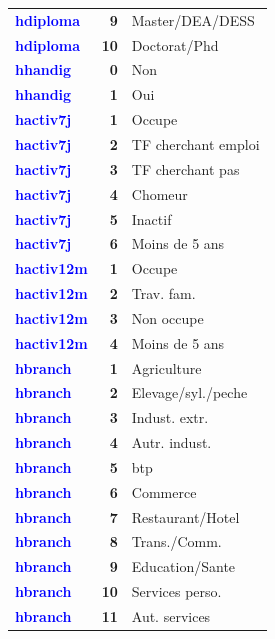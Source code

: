 \documentclass[
]{article}
\begin{document}
\begin{longtable}[t]{>{}l>{}r>{\raggedright\arraybackslash}p{8cm}}
\textcolor{blue}{\textbf{hdiploma}} & \textbf{9} & Master/DEA/DESS\\
\textcolor{blue}{\textbf{hdiploma}} & \textbf{10} & Doctorat/Phd\\
\addlinespace
\textcolor{blue}{\textbf{hhandig}} & \textbf{0} & Non\\
\textcolor{blue}{\textbf{hhandig}} & \textbf{1} & Oui\\
\textcolor{blue}{\textbf{hactiv7j}} & \textbf{1} & Occupe\\
\textcolor{blue}{\textbf{hactiv7j}} & \textbf{2} & TF cherchant emploi\\
\textcolor{blue}{\textbf{hactiv7j}} & \textbf{3} & TF cherchant pas\\
\addlinespace
\textcolor{blue}{\textbf{hactiv7j}} & \textbf{4} & Chomeur\\
\textcolor{blue}{\textbf{hactiv7j}} & \textbf{5} & Inactif\\
\textcolor{blue}{\textbf{hactiv7j}} & \textbf{6} & Moins de 5 ans\\
\textcolor{blue}{\textbf{hactiv12m}} & \textbf{1} & Occupe\\
\textcolor{blue}{\textbf{hactiv12m}} & \textbf{2} & Trav. fam.\\
\addlinespace
\textcolor{blue}{\textbf{hactiv12m}} & \textbf{3} & Non occupe\\
\textcolor{blue}{\textbf{hactiv12m}} & \textbf{4} & Moins de 5 ans\\
\textcolor{blue}{\textbf{hbranch}} & \textbf{1} & Agriculture\\
\textcolor{blue}{\textbf{hbranch}} & \textbf{2} & Elevage/syl./peche\\
\textcolor{blue}{\textbf{hbranch}} & \textbf{3} & Indust. extr.\\
\addlinespace
\textcolor{blue}{\textbf{hbranch}} & \textbf{4} & Autr. indust.\\
\textcolor{blue}{\textbf{hbranch}} & \textbf{5} & btp\\
\textcolor{blue}{\textbf{hbranch}} & \textbf{6} & Commerce\\
\textcolor{blue}{\textbf{hbranch}} & \textbf{7} & Restaurant/Hotel\\
\textcolor{blue}{\textbf{hbranch}} & \textbf{8} & Trans./Comm.\\
\addlinespace
\textcolor{blue}{\textbf{hbranch}} & \textbf{9} & Education/Sante\\
\textcolor{blue}{\textbf{hbranch}} & \textbf{10} & Services perso.\\
\textcolor{blue}{\textbf{hbranch}} & \textbf{11} & Aut. services\\

\end{longtable}
\end{document}
